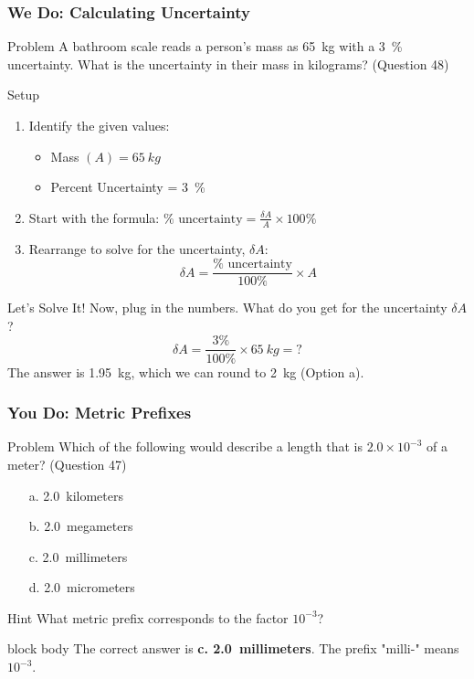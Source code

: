 \documentclass{beamer}
\begin{document}
\begin{frame}
    \frametitle{We Do: Calculating Uncertainty}
    \begin{alertblock}{Problem}
        A bathroom scale reads a person's mass as \SI{65}{kg} with a \SI{3}{\percent} uncertainty. What is the uncertainty in their mass in kilograms? (Question 48)
    \end{alertblock}
    \pause
    \begin{block}{Setup}
        \begin{enumerate}
            \item Identify the given values:
            \begin{itemize}
                \item Mass \( (A) = \SI{65}{kg} \)
                \item Percent Uncertainty = \SI{3}{\percent}
            \end{itemize}
            \pause
            \item Start with the formula: \( \% \text{ uncertainty} = \frac{\delta A}{A} \times 100\% \)
            \pause
            \item Rearrange to solve for the uncertainty, \(\delta A\):
            \[ \delta A = \frac{\% \text{ uncertainty}}{100\%} \times A \]
        \end{enumerate}
    \end{block}
    \pause
    \begin{exampleblock}{Let's Solve It!}
        Now, plug in the numbers. What do you get for the uncertainty \(\delta A\)?
        \[ \delta A = \frac{3\%}{100\%} \times \SI{65}{kg} = \textbf{?} \]
        \pause
        The answer is \SI{1.95}{kg}, which we can round to \SI{2}{kg} (Option a).
    \end{exampleblock}
\end{frame}

\begin{frame}
    \frametitle{You Do: Metric Prefixes}
    \begin{alertblock}{Problem}
        Which of the following would describe a length that is \(2.0 \times 10^{-3}\) of a meter? (Question 47)
    \end{alertblock}
    \pause
    \begin{itemize}
        \item[a.] \SI{2.0}{kilometers}
        \pause
        \item[b.] \SI{2.0}{megameters}
        \pause
        \item[c.] \SI{2.0}{millimeters}
        \pause
        \item[d.] \SI{2.0}{micrometers}
    \end{itemize}
    \pause
    \begin{block}{Hint}
        What metric prefix corresponds to the factor \(10^{-3}\)?
    \end{block}
    \pause
    \begin{beamercolorbox}[rounded=true,center,wd=\textwidth]{block body}
        The correct answer is \textbf{c. \SI{2.0}{millimeters}}. The prefix "milli-" means \(10^{-3}\).
    \end{beamercolorbox}
\end{frame}
\end{document}
